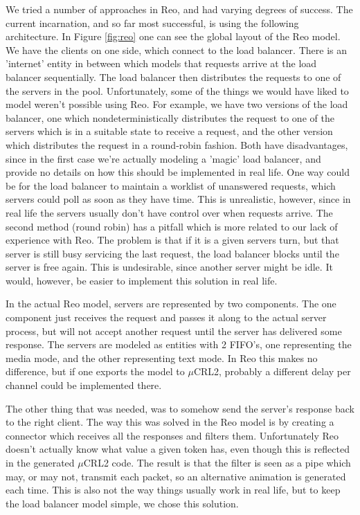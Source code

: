 \documentclass[a4paper]{article}
\newcommand{\re}{Reo\xspace}
\newcommand{\mcrl}{$\mu$CRL2\xspace}
\begin{document}
We tried a number of approaches in \re, and had varying degrees of success. The
current incarnation, and so far most successful, is using the following
architecture. In Figure \ref{fig:reo} one can see the global layout of the \re
model. We have the clients on one side, which connect to the load balancer.
There is an 'internet' entity in between which models that requests arrive at
the load balancer sequentially. The load balancer then distributes the requests
to one of the servers in the pool. Unfortunately, some of the things we would
have liked to model weren't possible using \re. For example, we have two
versions of the load balancer, one which nondeterministically distributes the
request to one of the servers which is in a suitable state to receive a request,
and the other version which distributes the request in a round-robin fashion.
Both have disadvantages, since in the first case we're actually modeling a
'magic' load balancer, and provide no details on how this should be implemented
in real life. One way could be for the load balancer to maintain a worklist of
unanswered requests, which servers could poll as soon as they have time. This is
unrealistic, however, since in real life the servers usually don't have control
over when requests arrive. The second method (round robin) has a pitfall which
is more related to our lack of experience with \re. The problem is that if it is a
given servers turn, but that server is still busy servicing the last request,
the load balancer blocks until the server is free again. This is undesirable,
since another server might be idle. It would, however, be easier to implement
this solution in real life.

In the actual \re model, servers are represented by two components. The one
component just receives the request and passes it along to the actual server
process, but will not accept another request until the server has delivered some
response. The servers are modeled as entities with 2 FIFO's, one representing
the media mode, and the other representing text mode. In \re this makes no
difference, but if one exports the model to \mcrl, probably a different delay
per channel could be
implemented there. 

The other thing that was needed, was to somehow send the server's response back
to the right client. The way this was solved in the \re model is by creating a
connector which receives all the responses and filters them. Unfortunately \re
doesn't actually know what value a given token has, even though this is
reflected in the generated \mcrl code. The result is that the filter is seen as
a pipe which may, or may not, transmit each packet, so an alternative animation
is generated each time. This is also not the way things usually work in real
life, but to keep the load balancer model simple, we chose this solution.
\end{document}
